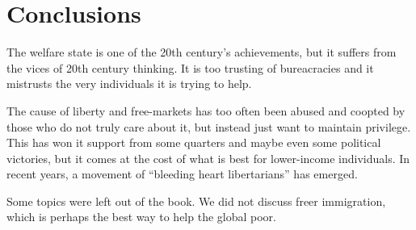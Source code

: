 \chapter{Conclusions}

The welfare state is one of the 20th century's achievements, but it suffers
from the vices of 20th century thinking. It is too trusting of bureacracies and
it mistrusts the very individuals it is trying to help.

The cause of liberty and free-markets has too often been abused and coopted by
those who do not truly care about it, but instead just want to maintain
privilege. This has won it support from some quarters and maybe even some
political victories, but it comes at the cost of what is best for lower-income
individuals. In recent years, a movement of ``bleeding heart libertarians'' has
emerged.

Some topics were left out of the book. We did not discuss freer immigration,
which is perhaps the best way to help the global poor.

